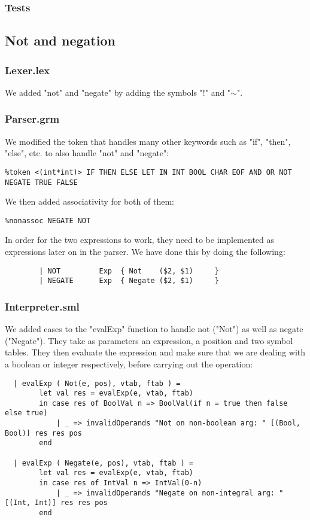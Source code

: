 \documentclass[12pt]{article}
\begin{document}
\subsubsection{Tests}

\subsection{Not and negation}
\subsubsection{Lexer.lex}
We added "not" and "negate" by adding the symbols "!" and "$\sim$".
\subsubsection{Parser.grm}
We modified the token that handles many other keywords such as "if", "then", "else", etc. to also handle "not" and "negate":
\begin{verbatim}
%token <(int*int)> IF THEN ELSE LET IN INT BOOL CHAR EOF AND OR NOT NEGATE TRUE FALSE
\end{verbatim}
We then added associativity for both of them: 
\begin{verbatim}
%nonassoc NEGATE NOT
\end{verbatim}
In order for the two expressions to work, they need to be implemented as expressions later on in the parser. We have done this by doing the following:
\begin{verbatim}
        | NOT         Exp  { Not    ($2, $1)     }
        | NEGATE      Exp  { Negate ($2, $1)     }
\end{verbatim}
\subsubsection{Interpreter.sml}
We added cases to the "evalExp" function to handle not ("Not") as well as negate ("Negate"). They take as parameters an expression, a position and two symbol tables. They then evaluate the expression and make sure that we are dealing with a boolean or integer respectively, before carrying out the operation:
\begin{verbatim}
  | evalExp ( Not(e, pos), vtab, ftab ) =
        let val res = evalExp(e, vtab, ftab)
        in case res of BoolVal n => BoolVal(if n = true then false else true)
            | _ => invalidOperands "Not on non-boolean arg: " [(Bool, Bool)] res res pos
        end

  | evalExp ( Negate(e, pos), vtab, ftab ) =
        let val res = evalExp(e, vtab, ftab)
        in case res of IntVal n => IntVal(0-n)
            | _ => invalidOperands "Negate on non-integral arg: " [(Int, Int)] res res pos
        end
\end{verbatim}
\end{document}
